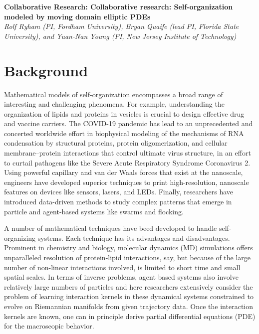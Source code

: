 \noindent
{\bf Collaborative Research:
Collaborative research: Self-organization modeled by moving domain
elliptic PDEs} \\
{\em Rolf Ryham (PI, Fordham University),
Bryan Quaife (lead PI, Florida State University), and
Yuan-Nan Young (PI, New Jersey Institute of Technology)}

\section{Background}
\label{sec:background}

Mathematical models of self-organization encompasses a
broad range of interesting and challenging phenomena.
For example, understanding the organization of lipids and proteins in vesicles
is crucial to design effective drug and vaccine carriers.
The COVID-19 pandemic has lead to an unprecedented and concerted worldwide
effort in biophysical modeling of the mechanisms of RNA condensation
by structural proteins, protein oligomerization, and cellular
membrane–protein interactions that control ultimate virus structure,
in an effort to curtail pathogens like the Severe Acute Respiratory Syndrome Coronavirus 2.
Using powerful capillary and van der Waals forces that exist at the nanoscale, engineers
have developed superior techniques to print 
high-resolution, nanoscale features on devices like sensors, lasers, and LEDs.
Finally, researchers have introduced data-driven methods 
to study complex patterns that emerge in particle and agent-based systems like swarms
and flocking.

A number of mathematical techniques have beed developed to handle
self-organizing systems.  Each technique has its advantages and disadvantages.
Prominent in chemistry and biology, molecular
dynamics (MD) simulations offers unparalleled resolution of protein-lipid interactions,
say, but because of the large number of non-linear interactions involved,
is limited to short time and small spatial scales.
In terms of inverse problems,
agent based systems also involve relatively large numbers of particles
and here researchers extensively consider the problem  
of learning interaction kernels in these dynamical systems
constrained to evolve on Riemannian manifolds from given trajectory data.
Once the interaction kernels are known, one can in principle derive
partial differential equations (PDE) for the macroscopic behavior. 

